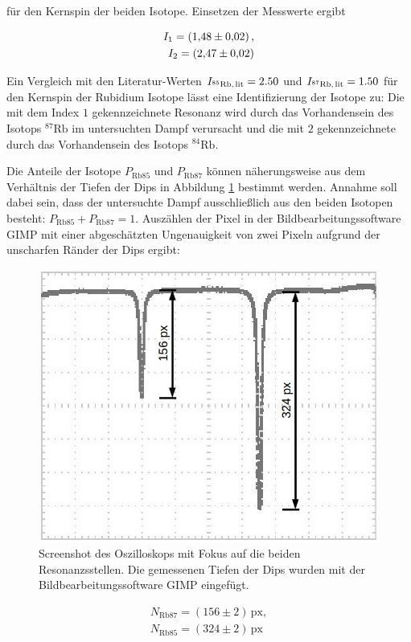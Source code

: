 für den Kernspin der beiden Isotope. Einsetzen der Messwerte ergibt

\begin{eqnarray}
	I_1 = \SI{1.48 \pm 0.02},\\
	I_2 = \SI{2.47 \pm 0.02}.
\end{eqnarray}

Ein Vergleich mit den Literatur-Werten $I_{{}^{85}\text{Rb,\,lit}} = 2.50$ und $I_{{}^{87}\text{Rb,\,lit}} = 1.50$ \cite{Rb} für den Kernspin der Rubidium Isotope lässt eine Identifizierung der Isotope zu: Die mit dem Index $1$ gekennzeichnete Resonanz wird durch das Vorhandensein des Isotops ${}^{87}\text{Rb}$ im untersuchten Dampf verursacht und die mit $2$ gekennzeichnete durch das Vorhandensein des Isotops ${}^{84}\text{Rb}$.

Die Anteile der Isotope $P_{\text{Rb}85}$ und $P_{\text{Rb}87}$ können näherungsweise aus dem Verhältnis der Tiefen der Dips in Abbildung \ref{fig:oszi2_3} bestimmt werden. Annahme soll dabei sein, dass der untersuchte Dampf ausschließlich aus den beiden Isotopen besteht: $P_{\text{Rb}85} + P_{\text{Rb}87} = 1$. Auszählen der Pixel in der Bildbearbeitungssoftware GIMP \cite{Gimp} mit einer abgeschätzten Ungenauigkeit von zwei Pixeln aufgrund der unscharfen Ränder der Dips ergibt:


\begin{figure}
	\centering
	\includegraphics[width=0.7\linewidth]{img/oszi2_3}
	\caption{Screenshot des Oszilloskops mit Fokus auf die beiden Resonanzsstellen. Die gemessenen Tiefen der Dips wurden mit der Bildbearbeitungssoftware GIMP eingefügt.}
	\label{fig:oszi2_3}
\end{figure}

\begin{eqnarray}
	N_{\text{Rb}87} = (156 \pm 2)\, \text{px},\\
	N_{\text{Rb}85} = (324 \pm 2)\, \text{px}
\end{eqnarray}

